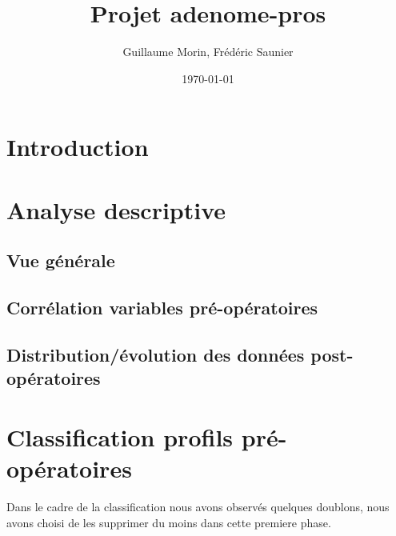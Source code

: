 \documentclass[12pt]{article}
\title{Projet  adenome-pros}
\author{Guillaume Morin, Frédéric Saunier}
\date{\today}
\begin{document}
\maketitle
\tableofcontents
\clearpage



\section{Introduction}

\newpage

\section{Analyse descriptive}

\subsection{Vue générale}
  

\subsection{Corrélation variables pré-opératoires}
  

\subsection{Distribution/évolution des données post-opératoires}
  
  
  
\newpage




\section{Classification profils pré-opératoires}

Dans le cadre de la classification nous avons observés quelques doublons, nous avons choisi de les supprimer 
du moins dans cette premiere phase. 
\end{document}
